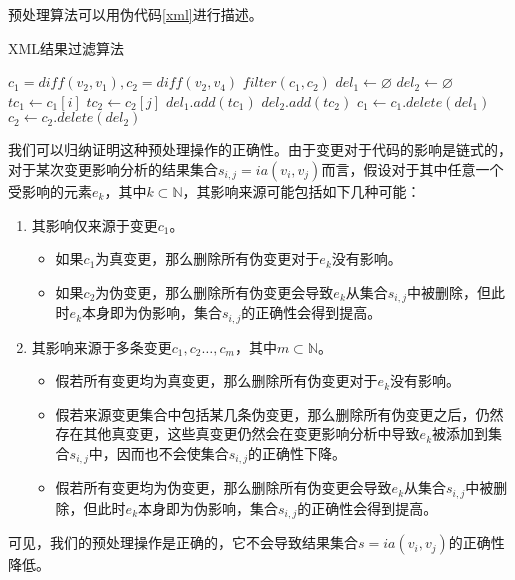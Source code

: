 预处理算法可以用伪代码\ref {xml}进行描述。

\begin{algorithm}
	\caption{XML结果过滤算法}
	\label{xml}
	\begin{algorithmic}[1]
		\Require $c_1 = diff(v_2, v_1), c_2 = diff(v_2,v_4)$
		\Ensure $filter(c_1, c_2)$
		\State $del_1 \gets \varnothing$
		\State $del_2 \gets \varnothing$
		\State $tc_1 \gets c_1[i]$
		\State $tc_2 \gets c_2[j]$
		\State $del_1.add(tc_1)$
		\State $del_2.add(tc_2)$
		\EndIf	
		\EndFor
		\EndFor
		\State $c_1 \gets c_1.delete(del_1)$
		\State $c_2 \gets c_2.delete(del_2)$
	\end{algorithmic}
\end{algorithm}

我们可以归纳证明这种预处理操作的正确性。由于变更对于代码的影响是链式的，对于某次变更影响分析的结果集合$s_{i,j} = ia(v_i,v_j)$而言，假设对于其中任意一个受影响的元素$e_k$，其中$k \subset \mathbb{N}$，其影响来源可能包括如下几种可能：
\begin{enumerate}
	\item 其影响仅来源于变更$c_1$。
	\begin{itemize}
		\item 如果$c_1$为真变更，那么删除所有伪变更对于$e_k$没有影响。
		\item 如果$c_2$为伪变更，那么删除所有伪变更会导致$e_k$从集合$s_{i,j}$中被删除，但此时$e_k$本身即为伪影响，集合$s_{i,j}$的正确性会得到提高。
	\end{itemize}
	\item 其影响来源于多条变更$c_1,c_2\dots,c_m$，其中$m \subset \mathbb{N}$。
	\begin{itemize}
		\item 假若所有变更均为真变更，那么删除所有伪变更对于$e_k$没有影响。
		\item 假若来源变更集合中包括某几条伪变更，那么删除所有伪变更之后，仍然存在其他真变更，这些真变更仍然会在变更影响分析中导致$e_k$被添加到集合$s_{i,j}$中，因而也不会使集合$s_{i,j}$的正确性下降。
		\item 假若所有变更均为伪变更，那么删除所有伪变更会导致$e_k$从集合$s_{i,j}$中被删除，但此时$e_k$本身即为伪影响，集合$s_{i,j}$的正确性会得到提高。
	\end{itemize}
\end{enumerate}

可见，我们的预处理操作是正确的，它不会导致结果集合$s = ia(v_i,v_j)$的正确性降低。


